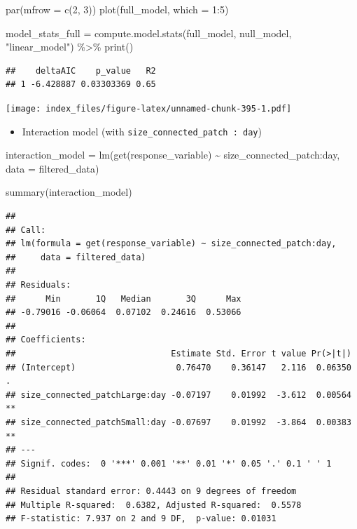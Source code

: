 \documentclass[
]{article}
\newenvironment{Shaded}{\begin{snugshade}}{\end{snugshade}}
\newcommand{\AttributeTok}[1]{\textcolor[rgb]{0.77,0.63,0.00}{#1}}
\newcommand{\DecValTok}[1]{\textcolor[rgb]{0.00,0.00,0.81}{#1}}
\newcommand{\FunctionTok}[1]{\textcolor[rgb]{0.00,0.00,0.00}{#1}}
\newcommand{\NormalTok}[1]{#1}
\newcommand{\OtherTok}[1]{\textcolor[rgb]{0.56,0.35,0.01}{#1}}
\newcommand{\SpecialCharTok}[1]{\textcolor[rgb]{0.00,0.00,0.00}{#1}}
\newcommand{\StringTok}[1]{\textcolor[rgb]{0.31,0.60,0.02}{#1}}
\providecommand{\tightlist}{%
  \setlength{\itemsep}{0pt}\setlength{\parskip}{0pt}}
\begin{document}
\begin{Shaded}
\begin{Highlighting}[]
\FunctionTok{par}\NormalTok{(}\AttributeTok{mfrow =} \FunctionTok{c}\NormalTok{(}\DecValTok{2}\NormalTok{, }\DecValTok{3}\NormalTok{))}
\FunctionTok{plot}\NormalTok{(full\_model, }\AttributeTok{which =} \DecValTok{1}\SpecialCharTok{:}\DecValTok{5}\NormalTok{)}

\NormalTok{model\_stats\_full }\OtherTok{=} \FunctionTok{compute.model.stats}\NormalTok{(full\_model,}
\NormalTok{                                       null\_model,}
                                       \StringTok{"linear\_model"}\NormalTok{) }\SpecialCharTok{\%\textgreater{}\%}
  \FunctionTok{print}\NormalTok{()}
\end{Highlighting}
\end{Shaded}

\begin{verbatim}
##    deltaAIC    p_value   R2
## 1 -6.428887 0.03303369 0.65
\end{verbatim}

\texttt{[image: index\_files/figure-latex/unnamed-chunk-395-1.pdf]}

\begin{itemize}
\tightlist
\item
  Interaction model (with \texttt{size\_connected\_patch\ :\ day})
\end{itemize}

\begin{Shaded}
\begin{Highlighting}[]
\NormalTok{interaction\_model }\OtherTok{=} \FunctionTok{lm}\NormalTok{(}\FunctionTok{get}\NormalTok{(response\_variable) }\SpecialCharTok{\textasciitilde{}}
\NormalTok{                         size\_connected\_patch}\SpecialCharTok{:}\NormalTok{day,}
                       \AttributeTok{data =}\NormalTok{ filtered\_data)}

\FunctionTok{summary}\NormalTok{(interaction\_model)}
\end{Highlighting}
\end{Shaded}

\begin{verbatim}
## 
## Call:
## lm(formula = get(response_variable) ~ size_connected_patch:day, 
##     data = filtered_data)
## 
## Residuals:
##      Min       1Q   Median       3Q      Max 
## -0.79016 -0.06064  0.07102  0.24616  0.53066 
## 
## Coefficients:
##                               Estimate Std. Error t value Pr(>|t|)   
## (Intercept)                    0.76470    0.36147   2.116  0.06350 . 
## size_connected_patchLarge:day -0.07197    0.01992  -3.612  0.00564 **
## size_connected_patchSmall:day -0.07697    0.01992  -3.864  0.00383 **
## ---
## Signif. codes:  0 '***' 0.001 '**' 0.01 '*' 0.05 '.' 0.1 ' ' 1
## 
## Residual standard error: 0.4443 on 9 degrees of freedom
## Multiple R-squared:  0.6382, Adjusted R-squared:  0.5578 
## F-statistic: 7.937 on 2 and 9 DF,  p-value: 0.01031
\end{verbatim}
\end{document}
